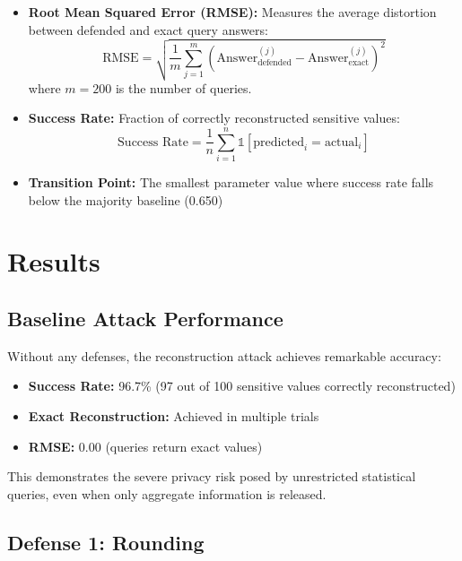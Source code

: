 \documentclass[11pt,letterpaper]{article}
\begin{document}
\begin{itemize}[leftmargin=*]
    \item \textbf{Root Mean Squared Error (RMSE):} Measures the average distortion between defended and exact query answers:
    \begin{equation}
        \text{RMSE} = \sqrt{\frac{1}{m} \sum_{j=1}^{m} (\text{Answer}_{\text{defended}}^{(j)} - \text{Answer}_{\text{exact}}^{(j)})^2}
    \end{equation}
    where $m = 200$ is the number of queries.
    
    \item \textbf{Success Rate:} Fraction of correctly reconstructed sensitive values:
    \begin{equation}
        \text{Success Rate} = \frac{1}{n} \sum_{i=1}^{n} \mathbb{1}[\text{predicted}_i = \text{actual}_i]
    \end{equation}
    
    \item \textbf{Transition Point:} The smallest parameter value where success rate falls below the majority baseline (0.650)
\end{itemize}

\section{Results}

\subsection{Baseline Attack Performance}

Without any defenses, the reconstruction attack achieves remarkable accuracy:

\begin{itemize}[leftmargin=*]
    \item \textbf{Success Rate:} 96.7\% (97 out of 100 sensitive values correctly reconstructed)
    \item \textbf{Exact Reconstruction:} Achieved in multiple trials
    \item \textbf{RMSE:} 0.00 (queries return exact values)
\end{itemize}

This demonstrates the severe privacy risk posed by unrestricted statistical queries, even when only aggregate information is released.

\subsection{Defense 1: Rounding}
\end{document}
